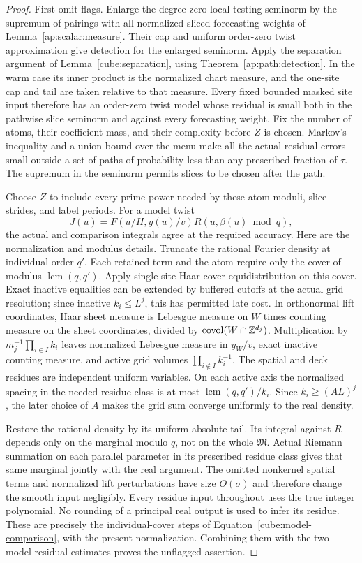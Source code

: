 \begin{proof}
First omit flags. Enlarge the degree-zero local testing seminorm by
the supremum of pairings with all normalized sliced forecasting
weights of Lemma~\ref{ap:scalar:measure}. Their cap and uniform
order-zero twist approximation give detection for the enlarged
seminorm. Apply the separation argument of
Lemma~\ref{cube:separation}, using Theorem~\ref{ap:path:detection}.
In the warm case its inner product is the normalized chart measure,
and the one-site cap and tail are taken relative to that measure.
Every fixed bounded masked site input therefore has an order-zero
twist model whose residual is small both in the pathwise slice
seminorm and against every forecasting weight. Fix the number of
atoms, their coefficient mass, and their complexity before $Z$ is
chosen. Markov's inequality and a union bound over the menu make all
the actual residual errors small outside a set of paths of probability
less than any prescribed fraction of $\tau$. The supremum in the
seminorm permits slices to be chosen after the path.

Choose $Z$ to include every prime power needed by these atom moduli,
slice strides, and label periods. For a model twist
\[
          J(u)=F(u/H,y(u)/v)R(u,\beta(u)\bmod q),
\]
the actual and comparison integrals agree at the required accuracy.
Here are the normalization and modulus details. Truncate the rational
Fourier density at individual order $q'$. Each retained term and the
atom require only the cover of modulus $\operatorname{lcm}(q,q')$.
Apply single-site Haar-cover equidistribution on this cover. Exact
inactive equalities can be extended by buffered cutoffs at the actual
grid resolution; since inactive $k_i\le L^j$, this has permitted late
cost. In orthonormal lift coordinates, Haar sheet measure is Lebesgue
measure on $W$ times counting measure on the sheet coordinates, divided
by $\operatorname{covol}(W\cap\mathbb Z^{d_j})$. Multiplication by
$m_j^{-1}\prod_{i\in I}k_i$ leaves normalized Lebesgue measure in
$y_W/v$, exact inactive counting measure, and active grid volumes
$\prod_{i\notin I}k_i^{-1}$. The spatial and deck residues are
independent uniform variables. On each active axis the normalized
spacing in the needed residue class is at most
$\operatorname{lcm}(q,q')/k_i$. Since $k_i\ge(AL)^j$, the later choice
of $A$ makes the grid sum converge uniformly to the real density.

Restore the rational density by its uniform absolute tail. Its integral
against $R$ depends only on the marginal modulo $q$, not on the whole
$\mathfrak M$. Actual Riemann summation on each parallel parameter in
its prescribed residue class gives that same marginal jointly with
the real argument. The omitted nonkernel spatial terms and normalized
lift perturbations have size $O(\sigma)$ and therefore change the
smooth input negligibly. Every residue input throughout uses the true
integer polynomial. No rounding of a principal real output is used to
infer its residue. These are precisely the individual-cover steps of
Equation~\eqref{cube:model-comparison}, with the present normalization.
Combining them with the two model residual estimates proves the
unflagged assertion.


\end{proof}
